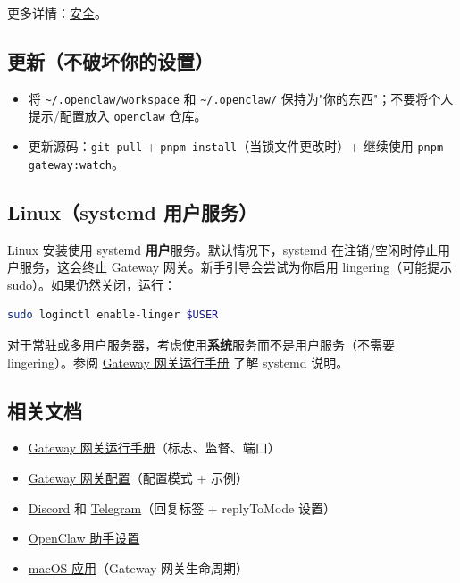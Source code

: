 更多详情：\href{/gateway/security\#credential-storage-map}{安全}。

\subsection{更新（不破坏你的设置）}


\begin{itemize}
  \item 将 \texttt{\textasciitilde{}/.openclaw/workspace} 和 \texttt{\textasciitilde{}/.openclaw/} 保持为"你的东西"；不要将个人提示/配置放入 \texttt{openclaw} 仓库。
  \item 更新源码：\texttt{git pull} + \texttt{pnpm install}（当锁文件更改时）+ 继续使用 \texttt{pnpm gateway:watch}。
\end{itemize}


\subsection{Linux（systemd 用户服务）}


Linux 安装使用 systemd \textbf{用户}服务。默认情况下，systemd 在注销/空闲时停止用户服务，这会终止 Gateway 网关。新手引导会尝试为你启用 lingering（可能提示 sudo）。如果仍然关闭，运行：

\begin{lstlisting}[language=bash]
sudo loginctl enable-linger $USER
\end{lstlisting}


对于常驻或多用户服务器，考虑使用\textbf{系统}服务而不是用户服务（不需要 lingering）。参阅 \href{/gateway}{Gateway 网关运行手册} 了解 systemd 说明。

\subsection{相关文档}


\begin{itemize}
  \item \href{/gateway}{Gateway 网关运行手册}（标志、监督、端口）
  \item \href{/gateway/configuration}{Gateway 网关配置}（配置模式 + 示例）
  \item \href{/channels/discord}{Discord} 和 \href{/channels/telegram}{Telegram}（回复标签 + replyToMode 设置）
  \item \href{/start/openclaw}{OpenClaw 助手设置}
  \item \href{/platforms/macos}{macOS 应用}（Gateway 网关生命周期）
\end{itemize}




